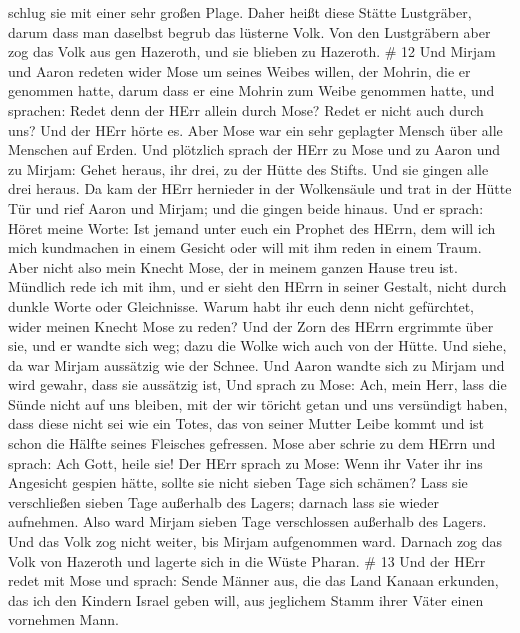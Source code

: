 schlug sie mit einer sehr großen Plage.  Daher heißt diese
Stätte Lustgräber, darum dass man daselbst begrub das lüsterne Volk.
 Von den Lustgräbern aber zog das Volk aus gen Hazeroth,
und sie blieben zu Hazeroth. \# 12  Und Mirjam und Aaron
redeten wider Mose um seines Weibes willen, der Mohrin, die er genommen
hatte, darum dass er eine Mohrin zum Weibe genommen hatte, 
und sprachen: Redet denn der HErr allein durch Mose? Redet er nicht auch
durch uns? Und der HErr hörte es.  Aber Mose war ein sehr
geplagter Mensch über alle Menschen auf Erden.  Und
plötzlich sprach der HErr zu Mose und zu Aaron und zu Mirjam: Gehet
heraus, ihr drei, zu der Hütte des Stifts. Und sie gingen alle drei
heraus.  Da kam der HErr hernieder in der Wolkensäule und
trat in der Hütte Tür und rief Aaron und Mirjam; und die gingen beide
hinaus.  Und er sprach: Höret meine Worte: Ist jemand unter
euch ein Prophet des HErrn, dem will ich mich kundmachen in einem
Gesicht oder will mit ihm reden in einem Traum.  Aber nicht
also mein Knecht Mose, der in meinem ganzen Hause treu ist. 
Mündlich rede ich mit ihm, und er sieht den HErrn in seiner Gestalt,
nicht durch dunkle Worte oder Gleichnisse. Warum habt ihr euch denn
nicht gefürchtet, wider meinen Knecht Mose zu reden?  Und
der Zorn des HErrn ergrimmte über sie, und er wandte sich weg;
 dazu die Wolke wich auch von der Hütte. Und siehe, da war
Mirjam aussätzig wie der Schnee. Und Aaron wandte sich zu Mirjam und
wird gewahr, dass sie aussätzig ist,  Und sprach zu Mose:
Ach, mein Herr, lass die Sünde nicht auf uns bleiben, mit der wir
töricht getan und uns versündigt haben,  dass diese nicht
sei wie ein Totes, das von seiner Mutter Leibe kommt und ist schon die
Hälfte seines Fleisches gefressen.  Mose aber schrie zu dem
HErrn und sprach: Ach Gott, heile sie!  Der HErr sprach zu
Mose: Wenn ihr Vater ihr ins Angesicht gespien hätte, sollte sie nicht
sieben Tage sich schämen? Lass sie verschließen sieben Tage außerhalb
des Lagers; darnach lass sie wieder aufnehmen.  Also ward
Mirjam sieben Tage verschlossen außerhalb des Lagers. Und das Volk zog
nicht weiter, bis Mirjam aufgenommen ward.  Darnach zog das
Volk von Hazeroth und lagerte sich in die Wüste Pharan. \# 13
 Und der HErr redet mit Mose und sprach:  Sende
Männer aus, die das Land Kanaan erkunden, das ich den Kindern Israel
geben will, aus jeglichem Stamm ihrer Väter einen vornehmen Mann.
